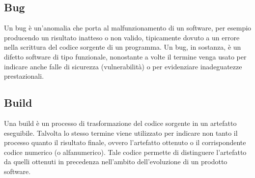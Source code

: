 \vspace{2em}
\subsection*{Bug}
Un bug è un'anomalia che porta al malfunzionamento di un software, per esempio producendo un risultato inatteso o non valido, tipicamente dovuto a un errore nella scrittura del codice sorgente di un programma. Un bug, in sostanza, è un difetto software di tipo funzionale, nonostante a volte il termine venga usato per indicare anche falle di sicurezza (vulnerabilità) o per evidenziare inadeguatezze prestazionali.

\vspace{2em}
\subsection*{Build}
Una build è un processo di trasformazione del codice sorgente in un artefatto eseguibile. Talvolta lo stesso termine viene utilizzato per indicare non tanto il processo quanto il risultato finale, ovvero l'artefatto ottenuto o il corrispondente codice numerico (o alfanumerico). Tale codice permette di distinguere l'artefatto da quelli ottenuti in precedenza nell'ambito dell'evoluzione di un prodotto software.
